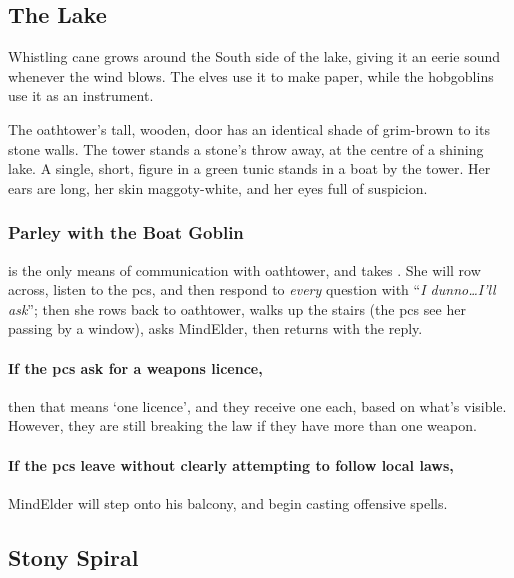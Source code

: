 \begin{multicols}{2}

\subsection{The Lake}

\noindent
Whistling cane grows around the South side of the lake, giving it an eerie sound whenever the wind blows.%
The elves use it to make paper, while the hobgoblins use it as an instrument.

\begin{boxtext}
  The \gls{oathtower}'s tall, wooden, door has an identical shade of grim-brown to its stone walls.
  The tower stands a stone's throw away, at the centre of a shining lake.
  A single, short, figure in a green tunic stands in a boat by the tower.
  Her ears are long, her skin maggoty-white, and her eyes full of suspicion.
\end{boxtext}

\subsubsection{Parley with the Boat Goblin}
is the only means of communication with \gls{oathtower}, and takes .
She will row across, listen to the \glspl{pc}, and then respond to \emph{every} question with ``\textit{I dunno\ldots I'll ask}''; then she rows back to \gls{oathtower}, walks up the stairs (the \glspl{pc} see her passing by a window), asks \gls{MindElder}, then returns with the reply.

\paragraph{If the \glspl{pc} ask for a weapons licence,}
then that means `one licence', and they receive one each, based on what's visible.
However, they are still breaking the law if they have more than one \gls{weapon}.


\paragraph{If the \glspl{pc} leave without clearly attempting to follow local laws,}
\gls{MindElder} will step onto his balcony, and begin casting offensive spells.

\subsection{Stony Spiral}


\end{multicols}
